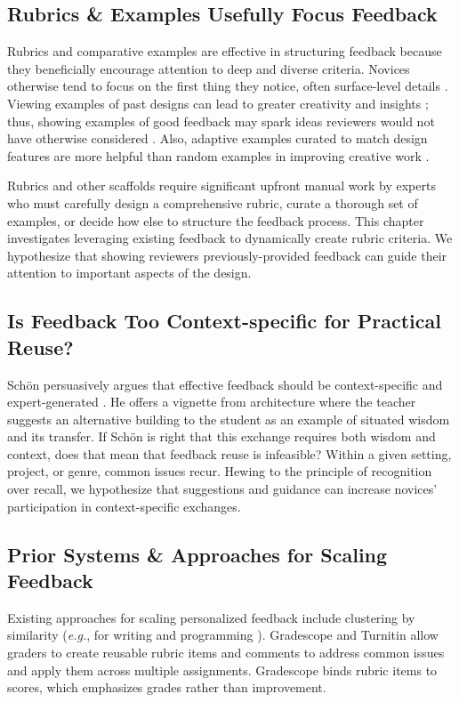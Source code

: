 \subsection{Rubrics \& Examples Usefully Focus Feedback}
Rubrics \cite{andrade2005teaching, yuan2016} and comparative examples \cite{Krause2017} are effective in structuring feedback because they beneficially encourage attention to deep and diverse criteria. Novices otherwise tend to focus on the first thing they notice, often surface-level details \cite{Greenberg2015, hicks2016framing, Kulkarni2015, yuan2016}. Viewing examples of past designs can lead to greater creativity and insights \cite{kulkarni2012early, marsh1996examples}; thus, showing examples of good feedback may spark ideas reviewers would not have otherwise considered \cite{Greenberg2015, kulkarni2013peer, Luther2015}. Also, adaptive examples curated to match design features are more helpful than random examples in improving creative work \cite{Lee2010}. 

Rubrics and other scaffolds require significant upfront manual work by experts who must carefully design a comprehensive rubric, curate a thorough set of examples, or decide how else to structure the feedback process. This chapter investigates leveraging existing feedback to dynamically create rubric criteria. We hypothesize that showing reviewers previously-provided feedback can guide their attention to important aspects of the design. 

\subsection{Is Feedback Too Context-specific for Practical Reuse?}
Schön persuasively argues that effective feedback should be context-specific and expert-generated \cite{schon1984reflective}. He offers a vignette from architecture where the teacher suggests an alternative building to the student as an example of situated wisdom and its transfer. If Sch\"{o}n is right that this exchange requires both wisdom and context, does that mean that feedback reuse is infeasible? Within a given setting, project, or genre, common issues recur. Hewing to the principle of recognition over recall, we hypothesize that suggestions and guidance can increase novices' participation in context-specific exchanges. 

\subsection{Prior Systems \& Approaches for Scaling Feedback}
Existing approaches for scaling personalized feedback include clustering by similarity (\textit{e.g.}, for writing \cite{Brooks2014} and programming \cite{Glassman2015, Head2017}). Gradescope \cite{Gradescope} and Turnitin \cite{Turnitin} allow graders to create reusable rubric items and comments to address common issues and apply them across multiple assignments. Gradescope binds rubric items to scores, which emphasizes grades rather than improvement. 

